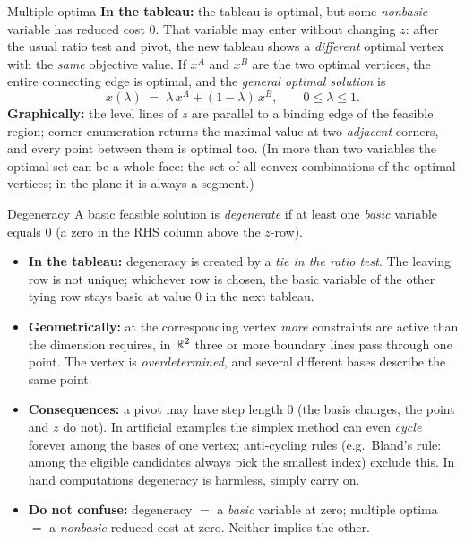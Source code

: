 \begin{rulebox}{Multiple optima}
\textbf{In the tableau:} the tableau is optimal, but some \emph{nonbasic}
variable has reduced cost $0$. That variable may enter without changing
$z$: after the usual ratio test and pivot, the new tableau shows a
\emph{different} optimal vertex with the \emph{same} objective value. If
$x^{A}$ and $x^{B}$ are the two optimal vertices, the entire connecting
edge is optimal, and the \emph{general optimal solution} is
\[
  x(\lambda)\;=\;\lambda\,x^{A}+(1-\lambda)\,x^{B},
  \qquad 0\le\lambda\le 1 .
\]
\textbf{Graphically:} the level lines of $z$ are parallel to a binding edge
of the feasible region; corner enumeration returns the maximal value at two
\emph{adjacent} corners, and every point between them is optimal too.
(In more than two variables the optimal set can be a whole face: the set
of all convex combinations of the optimal vertices; in the plane it is
always a segment.)
\end{rulebox}

\begin{rulebox}{Degeneracy}
A basic feasible solution is \emph{degenerate} if at least one \emph{basic}
variable equals $0$ (a zero in the RHS column above the $z$-row).
\begin{itemize}[leftmargin=1.6em,itemsep=0.3ex]
  \item \textbf{In the tableau:} degeneracy is created by a \emph{tie in
        the ratio test}. The leaving row is not unique; whichever row is
        chosen, the basic variable of the other tying row stays basic at
        value $0$ in the next tableau.
  \item \textbf{Geometrically:} at the corresponding vertex \emph{more}
        constraints are active than the dimension requires, in $\mathbb{R}^{2}$
        three or more boundary lines pass through one point. The vertex is
        \emph{overdetermined}, and several different bases describe the same
        point.
  \item \textbf{Consequences:} a pivot may have step length $0$ (the basis
        changes, the point and $z$ do not). In artificial examples the
        simplex method can even \emph{cycle} forever among the bases of one
        vertex; anti-cycling rules (e.g.\ Bland's rule: among the eligible
        candidates always pick the smallest index) exclude this. In hand
        computations degeneracy is harmless, simply carry on.
  \item \textbf{Do not confuse:} degeneracy $=$ a \emph{basic} variable at
        zero; multiple optima $=$ a \emph{nonbasic} reduced cost at zero.
        Neither implies the other.
\end{itemize}
\end{rulebox}

